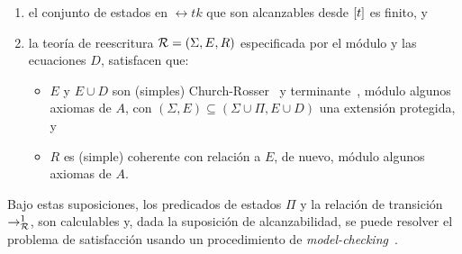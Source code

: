 \begin{enumerate}
   \item el conjunto de estados en $\rel{t}{k}$ que son alcanzables desde
	$[t]$ es finito, y

   \item la teor\'ia de reescritura $\mathcal{R} = (\Sigma,E,R)$ especificada
	por el m\'odulo  y las ecuaciones $D$, satisfacen que:
	\begin{itemize}
	   \item $E$ y $E \cup D$ son (simples) Church-Rosser~\cite{DBLP:journals/jlp/DuranM12}
		y terminante~\cite{Lucas2009207}, m\'odulo algunos axiomas
		de $A$, con $(\Sigma,E) \subseteq (\Sigma \cup \Pi, E \cup D)$
		una extensi\'on protegida, y

	   \item $R$ es (simple) coherente con relaci\'on a $E$, de nuevo,
		m\'odulo algunos axiomas de $A$.
	\end{itemize}
\end{enumerate}

Bajo estas suposiciones, los predicados de estados $\Pi$ y la relaci\'on de 
transici\'on $\rightarrow_{\mathcal{R}}^{1}$, son calculables y, dada la suposici\'on de
alcanzabilidad, se puede resolver el problema de satisfacci\'on usando un
procedimiento de {\em model-checking}~\cite{clarke-book}.


